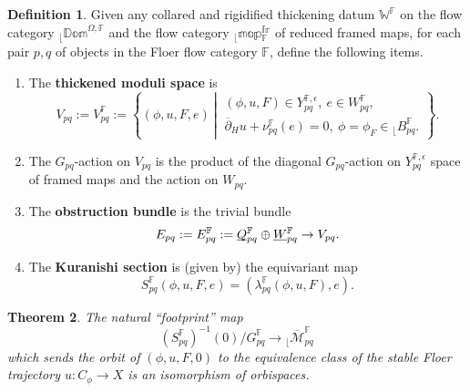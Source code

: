 \documentclass[reqno, 10pt]{amsart}
\numberwithin{equation}{section}
\numberwithin{equation}{section}
\newtheorem{thm}{Theorem}[section]
\theoremstyle{definition}
\newtheorem{defn}[thm]{Definition}
\theoremstyle{remark}
\newcommand{\beqn}{\begin{equation*}}
\newcommand{\eeqn}{\end{equation*}}
\newcommand{\ov}{\overline}
\newcommand{\mb}{\mathbb}
\newcommand{\mc}{\mathcal}
\renewcommand{\outer}{{}_{\lfloor}}
\newcommand{\uds}[1]{\underline{\smash{#1}}}
\begin{document}
\begin{defn}\label{defn_thickened_moduli}
Given any collared and rigidified thickening datum $\mb{W}^{\mb F}$ on the flow category $\outer \mb{Dom}^{\Omega, {\mb F}}$ and the flow category $\outer {\mb{map}}{}_{{\mb F}}^{\mb{fr}}$ of reduced framed maps, for each pair $p, q$ of objects in the Floer flow category ${\mb F}$, define the following items.

\begin{enumerate}

\item The {\bf thickened moduli space} is
\beqn
V_{pq}:= V_{pq}^{\mb F}:= \left\{ (\phi, u, F, e)\ \left|\ \begin{array}{c} (\phi, u, F) \in Y_{pq}^{{\mb F}, \epsilon},\ e \in W_{pq}^{\mb F},\\
\ov\partial_H u + \nu_{pq}^{\mb F} (e) = 0,\ \phi = \phi_F \in \outer B_{pq}^{\mb F}. \end{array} \right. \right\}.
\eeqn

\item The $G_{pq}$-action on $V_{pq}$ is the product of the diagonal $G_{pq}$-action on $Y_{pq}^{\mb{F}, \epsilon}$ space of framed maps and the action on $W_{pq}$.

\item The {\bf obstruction bundle} is the trivial bundle
\beqn
E_{pq}:= E_{pq}^{\mb F}:= \uds Q_{pq}^{\mb F} \oplus 
\uds W_{pq}^{\mb F} \to V_{pq}.
\eeqn

\item The {\bf Kuranishi section} is (given by) the equivariant map
\beqn
S_{pq}^{\mb F} (\phi, u,  F, e) = (\lambda_{pq}^{\mb F}(\phi, u, F), e).
\eeqn

\end{enumerate}
\end{defn}











\begin{thm}\label{thm_footprint}
The natural ``footprint'' map
\beqn
 (S_{pq}^{\mb F})^{-1}(0)/ G_{pq}^{\mb F} \to \outer \ov{\mc M}_{pq}^{\mb F}
\eeqn
which sends the orbit of $(\phi, u, F, 0)$ to the equivalence class of the stable Floer trajectory $u: C_\phi \to X$ is an isomorphism of orbispaces.
\end{thm}
\end{document}
